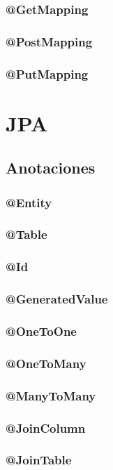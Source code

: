 \documentclass[12pt,article,oneside]{memoir}
\begin{document}
				\subsubsection{@GetMapping}
				\subsubsection{@PostMapping}
				\subsubsection{@PutMapping}
	\newpage
		\section{JPA}
	\newpage
			\subsection{Anotaciones}
				\subsubsection{ @Entity }
				\subsubsection{ @Table }
				\subsubsection{ @Id }
				\subsubsection{ @GeneratedValue }
				\subsubsection{ @OneToOne }
				\subsubsection{ @OneToMany }
				\subsubsection{ @ManyToMany }
				\subsubsection{ @JoinColumn }
				\subsubsection{ @JoinTable }
	\newpage
\end{document}
